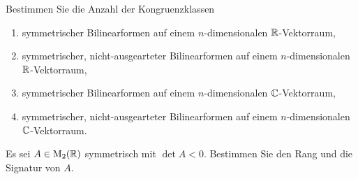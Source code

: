 \documentclass[a4paper, 10pt]{scrartcl}
\begin{document}





\begin{question}[subtitle = Anzahl von Kongruenzklassen]
  Bestimmen Sie die Anzahl der Kongruenzklassen
  \begin{enumerate}
    \item
      symmetrischer Bilinearformen auf einem $n$-dimensionalen $\mathbb{R}$-Vektorraum,
    \item
      symmetrischer, nicht-ausgearteter Bilinearformen auf einem $n$-dimensionalen $\mathbb{R}$-Vektorraum,
    \item
      symmetrischer Bilinearformen auf einem $n$-dimensionalen $\mathbb{C}$-Vektorraum,
    \item
      symmetrischer, nicht-ausgearteter Bilinearformen auf einem $n$-dimensionalen $\mathbb{C}$-Vektorraum.
  \end{enumerate}
\end{question}





\begin{question}[subtitle = Eine symmetrische $(2 \times 2)$-Matrix]
  Es sei $A \in \operatorname{M}_{2}(\mathbb{R})$ symmetrisch mit $\det A < 0$.
  Bestimmen Sie den Rang und die Signatur von $A$.
\end{question}
\end{document}
